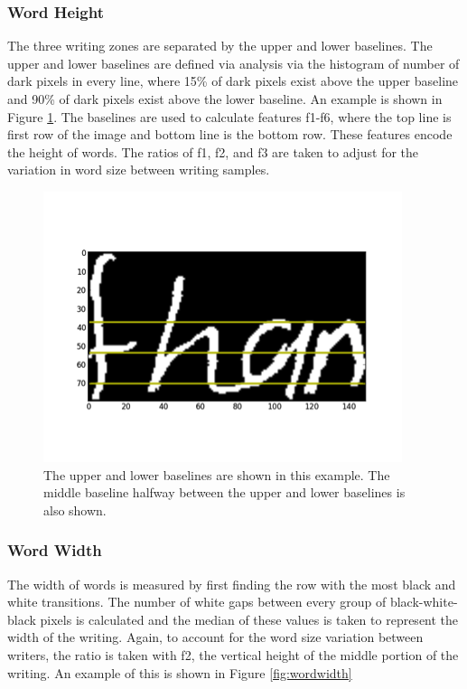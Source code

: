 \documentclass[paper=a4, fontsize=11pt]{scrartcl} %
\numberwithin{equation}{section} %
\numberwithin{figure}{section} %
\numberwithin{table}{section} %
\begin{document}
\subsubsection{Word Height}
The three writing zones are separated by the upper and lower
baselines. The upper and lower baselines are defined via analysis via
the histogram of number of dark pixels in every line, where 15\% of
dark pixels exist above the upper baseline and 90\% of dark pixels
exist above the lower baseline. An example is shown in Figure \ref{fig:wordheight}. The baselines are used to calculate
features f1-f6, where the top line is first row of the image and
bottom line is the bottom row. These features encode the height of
words. The ratios of f1, f2, and f3 are taken to adjust for the
variation in word size between writing samples.

\begin{figure}
  \centering \includegraphics{wordheight.png}
  \caption{The upper and lower baselines are shown in this example. The middle baseline halfway between the upper and lower baselines is also shown.}
  \label{fig:wordheight}
\end{figure}

\subsubsection{Word Width}
The width of words is measured by first finding the row with the most
black and white transitions. The number of white gaps between every
group of black-white-black pixels is calculated and the median of
these values is taken to represent the width of the writing. Again, to
account for the word size variation between writers, the ratio is
taken with f2, the vertical height of the middle portion of the
writing. An example of this is shown in Figure \ref{fig:wordwidth}
\end{document}
